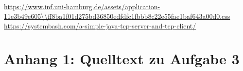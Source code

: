 \documentclass[twoside]{article}
\begin{document}
\subsection{}
\subsection{}

\begin{thebibliography}{1}
	\url{https://www.inf.uni-hamburg.de/assets/application-11e3b49e605\\ff8ba1f01d275bd36850edfdfc1fbbb8c22e55fae1baf643a00d0.css}
	\url{https://systembash.com/a-simple-java-tcp-server-and-tcp-client/}
\end{thebibliography}
\newpage
\section*{Anhang 1: Quelltext zu Aufgabe 3}
\end{document}
